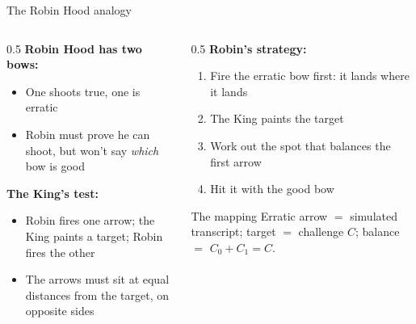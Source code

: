 \ifdefined\PRESENTATION\else\PassOptionsToClass{handout}{beamer}\fi\documentclass[aspectratio=169, lualatex]{beamer}
\begin{document}
\begin{frame}{The Robin Hood analogy}
	\begin{columns}[c]
		\begin{column}{0.5\textwidth}
			\textbf{Robin Hood has two bows:}
			\begin{itemize}
				\item One shoots true, one is erratic
				\item Robin must prove he can shoot, but won't say \textit{which} bow is good
			\end{itemize}
			\textbf{The King's test:}
			\begin{itemize}
				\item Robin fires one arrow; the King paints a target; Robin fires the other
				\item The arrows must sit at equal distances from the target, on opposite sides
			\end{itemize}
		\end{column}
		\begin{column}{0.5\textwidth}
			\textbf{Robin's strategy:}
			\begin{enumerate}
				\item Fire the erratic bow first: it lands where it lands
				\item The King paints the target
				\item Work out the spot that balances the first arrow
				\item Hit it with the good bow
			\end{enumerate}
			\begin{alertblock}{The mapping}
				Erratic arrow $=$ simulated transcript; target $=$ challenge $C$; balance $=$ $C_0 + C_1 = C$.
			\end{alertblock}
		\end{column}
	\end{columns}
\end{frame}
\end{document}
